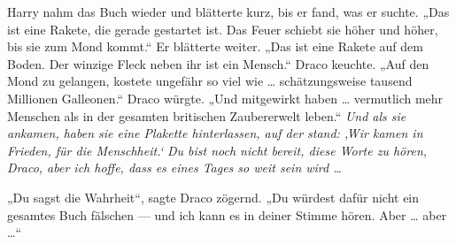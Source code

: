 Harry nahm das Buch wieder und blätterte kurz, bis er fand, was er suchte.
„Das ist eine Rakete, die gerade gestartet ist. Das Feuer schiebt sie höher und höher, bis sie zum Mond kommt.“ Er blätterte weiter.
„Das ist eine Rakete auf dem Boden. Der winzige Fleck neben ihr ist ein Mensch.“ Draco keuchte.
„Auf den Mond zu gelangen, kostete ungefähr so viel wie … schätzungsweise tausend Millionen Galleonen.“ Draco würgte.
„Und mitgewirkt haben … vermutlich mehr Menschen als in der gesamten britischen Zaubererwelt leben.“ \emph{Und als sie ankamen, haben sie eine Plakette hinterlassen, auf der stand: ‚Wir kamen in Frieden, für die Menschheit.‘ Du bist noch nicht bereit, diese Worte zu hören, Draco, aber ich hoffe, dass es eines Tages so weit sein wird …}

„Du sagst die Wahrheit“, sagte Draco zögernd.
„Du würdest dafür nicht ein gesamtes Buch fälschen — und ich kann es in deiner Stimme hören. Aber … aber …“

